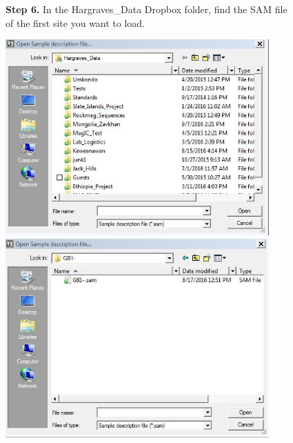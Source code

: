 \documentclass[11pt,letterpaper]{article}
\begin{document}
\begin{figure}
\begin{flushleft}
\textbf{Step 6.}
In the Hargraves\_Data Dropbox folder, find the SAM file of the first site you want to load.
\end{flushleft}
\centering
\includegraphics[width=0.9\textwidth]{images/Capture5.jpg}
\includegraphics[width=0.9\textwidth]{images/Capture6.jpg}
\end{figure}
\end{document}
